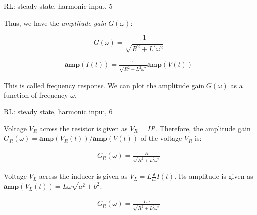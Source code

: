 \documentclass{beamer}
\begin{document}
\begin{frame}{RL: steady state, harmonic input, 5}
	\begin{flushleft}
		
		Thus, we have the \emph{amplitude gain} $G(\omega)$:
		
		\begin{equation}
			G(\omega) = \frac{1}{\sqrt{R^2 + L^2 \omega^2}}
		\end{equation}
		
		\begin{align}
			\mathbf{amp}(I(t)) 
			=
			\frac{1}{\sqrt{R^2 + L^2 \omega^2}} \mathbf{amp}(V(t)) 
		\end{align}
	
		This is called frequency response. We can plot the amplitude gain $G(\omega)$ as a function of frequency $\omega$.
		
		
	\end{flushleft}
\end{frame}





\begin{frame}{RL: steady state, harmonic input, 6}
	\begin{flushleft}
		
		Voltage $V_R$ across the resistor is given as $V_R = IR$. Therefore, the amplitude gain $G_R(\omega) = \mathbf{amp}(V_R(t)) / \mathbf{amp}(V(t)) $ of the voltage $V_R$ is:
		
		\begin{align}
			G_R(\omega)
			=
			\frac{R}{\sqrt{R^2 + L^2 \omega^2}} 
		\end{align}
	
		Voltage $V_L$ across the inducer is given as $V_L = L \frac{d}{dt}I(t)$. Its amplitude is given as $\mathbf{amp}(V_L(t)) = L\omega\sqrt{a^2 + b^2}$:
		
		\begin{align}
			G_R(\omega)
			=
			\frac{L\omega}{\sqrt{R^2 + L^2 \omega^2}} 
		\end{align}
		
	\end{flushleft}
\end{frame}
\end{document}

